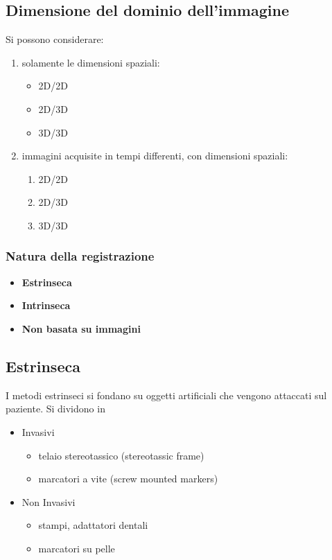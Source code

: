 \subsection{Dimensione del dominio dell'immagine}
Si possono considerare:
\begin{enumerate}
    \item solamente le dimensioni spaziali:
          \begin{itemize}
              \item 2D/2D
              \item 2D/3D
              \item 3D/3D
          \end{itemize}
    \item immagini acquisite in tempi differenti, con dimensioni spaziali:
          \begin{enumerate}
              \item 2D/2D
              \item 2D/3D
              \item 3D/3D
          \end{enumerate}
\end{enumerate}

\subsubsection{Natura della registrazione}
\begin{itemize}
    \item \textbf{Estrinseca}
    \item \textbf{Intrinseca}
    \item \textbf{Non basata su immagini}
\end{itemize}

\subsection{Estrinseca}
I metodi estrinseci si fondano su oggetti artificiali che vengono attaccati sul paziente. Si dividono in
\begin{itemize}
    \item Invasivi
          \begin{itemize}
              \item telaio stereotassico (stereotassic frame)
              \item marcatori a vite (screw mounted markers)
          \end{itemize}
    \item Non Invasivi
          \begin{itemize}
              \item stampi, adattatori dentali
              \item marcatori su pelle
          \end{itemize}
\end{itemize}

